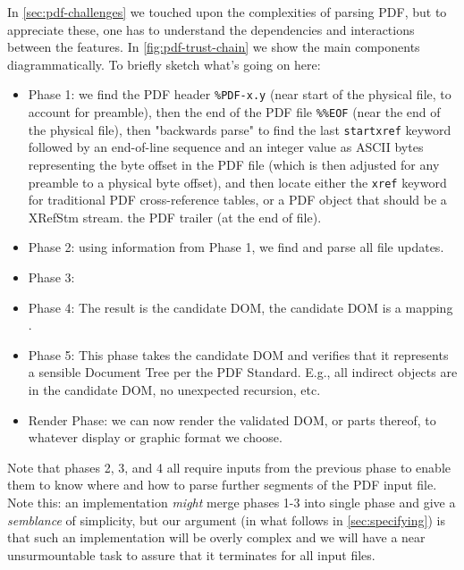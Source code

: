 In \cref{sec:pdf-challenges} we touched upon the complexities of parsing
PDF, but to appreciate these, one has to understand the
dependencies and interactions between the features.
In \cref{fig:pdf-trust-chain} we show the main components diagrammatically.
To briefly sketch what's going on here:
\begin{itemize}
\item Phase 1: we find the PDF header \verb|%PDF-x.y| (near start of the physical file, to account for preamble), then the end of the PDF file \verb|%%EOF| (near the end of the physical file), then "backwards parse" to find the last \verb|startxref| keyword followed by an end-of-line sequence and an integer value as ASCII bytes representing the byte offset in the PDF file (which is then adjusted for any preamble to a physical byte offset), and then locate either the \verb|xref| keyword for traditional PDF cross-reference tables, or a PDF object that should be a XRefStm stream.
  the PDF trailer (at the end of file).
\item Phase 2: using information from Phase 1, we find and parse all file
  updates.
\item Phase 3: 
\item Phase 4:  The result is the candidate DOM, 
  the candidate DOM is a mapping .
\item Phase 5: This phase takes the candidate DOM and verifies that
  it represents a sensible Document Tree per the PDF Standard.  E.g.,
  all indirect objects are in the candidate DOM, no unexpected recursion,
  etc.
\item Render Phase: we can now render the validated DOM, or parts thereof, to
  whatever display or graphic format we choose.
\end{itemize}

Note that phases 2, 3, and 4
all require inputs from the previous phase to enable them to know where and
how to parse further segments of the PDF input file.
%
Note this: an implementation \emph{might} merge phases 1-3 into single phase
and give a \emph{semblance} of simplicity, but our argument (in what
follows in \cref{sec:specifying}) is that such an implementation will be
overly complex and we will have a near unsurmountable task to assure that it
terminates for all input files.


